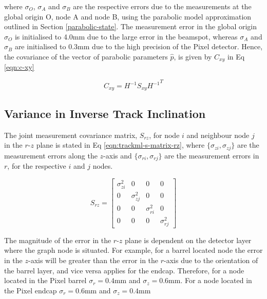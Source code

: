 where $\sigma_O$, $\sigma_A$ and $\sigma_B$ are the respective errors due to the measurements at the global origin O, node A and node B, using the parabolic model approximation outlined in Section \ref{parabolic-state}. The measurement error in the global origin $\sigma_O$ is initialised to 4.0mm due to the large error in the beamspot, whereas $\sigma_A$ and $\sigma_B$ are initialised to 0.3mm due to the high precision of the Pixel detector. Hence, the covariance of the vector of parabolic parameters $\hat{p}$, is given by $C_{xy}$ in Eq \eqref{eqn:c-xy}

\begin{equation}
    C_{xy} = H^{-1}S_{xy}{H^{-1}}^{T}
    \label{eqn:c-xy}
\end{equation}






\subsection{Variance in Inverse Track Inclination}

The joint measurement covariance matrix, $S_{rz}$, for node $i$ and neighbour node $j$ in the $r$-$z$ plane is stated in Eq \eqref{eqn:trackml-s-matrix-rz}, where $\{ \sigma_{zi}, \sigma_{zj} \}$ are the measurement errors along the $z$-axis and $\{ \sigma_{ri}, \sigma_{rj} \}$ are the measurement errors in $r$, for the respective $i$ and $j$ nodes. 

\begin{equation}
    S_{rz} = \begin{bmatrix} \sigma_{zi}^{2} & 0 & 0 & 0 \\ 
                             0 & \sigma_{zj}^{2} & 0 & 0 \\ 
                             0 & 0 & \sigma_{ri}^{2} & 0 \\
                             0 & 0 & 0 & \sigma_{rj}^{2}
                            \end{bmatrix} 
    \label{eqn:trackml-s-matrix-rz}
\end{equation}


The magnitude of the error in the $r$-$z$ plane is dependent on the detector layer where the graph node is situated. For example, for a barrel located node the error in the $z$-axis will be greater than the error in the $r$-axis due to the orientation of the barrel layer, and vice versa applies for the endcap. Therefore, for a node located in the Pixel barrel $\sigma_r = 0.4$mm and $\sigma_z = 0.6$mm. For a node located in the Pixel endcap $\sigma_r = 0.6$mm and $\sigma_z = 0.4$mm

